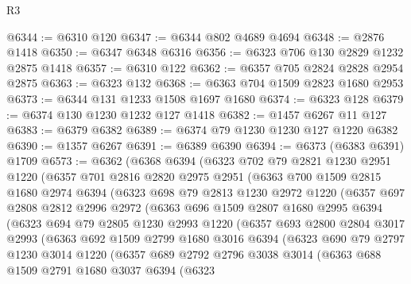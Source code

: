 \begin{lexlean}{R3}
\begin{coremodule}
@6344 := @6310 @120
@6347 := @6344 @802 @4689 @4694
@6348 := @2876 @1418
@6350 := @6347 @6348 @6316
@6356 := @6323 @706 @130 @2829 @1232 @2875 @1418
@6357 := @6310 @122
@6362 := @6357 @705 @2824 @2828 @2954 @2875
@6363 := @6323 @132
@6368 := @6363 @704 @1509 @2823 @1680 @2953
@6373 := @6344 @131 @1233 @1508 @1697 @1680
@6374 := @6323 @128
@6379 := @6374 @130 @1230 @1232 @127 @1418
@6382 := @1457 @6267 @11 @127
@6383 := @6379 @6382
@6389 := @6374 @79 @1230 @1230 @127 @1220 @6382
@6390 := @1357 @6267
@6391 := @6389 @6390
@6394 := @6373 (@6383 @6391) @1709
@6573 := @6362
    (@6368
      @6394
      (@6323
        @702
        @79
        @2821
        @1230
        @2951
        @1220
        (@6357
          @701
          @2816
          @2820
          @2975
          @2951
          (@6363
            @700
            @1509
            @2815
            @1680
            @2974
            @6394
            (@6323
              @698
              @79
              @2813
              @1230
              @2972
              @1220
              (@6357
                @697
                @2808
                @2812
                @2996
                @2972
                (@6363
                  @696
                  @1509
                  @2807
                  @1680
                  @2995
                  @6394
                  (@6323
                    @694
                    @79
                    @2805
                    @1230
                    @2993
                    @1220
                    (@6357
                      @693
                      @2800
                      @2804
                      @3017
                      @2993
                      (@6363
                        @692
                        @1509
                        @2799
                        @1680
                        @3016
                        @6394
                        (@6323
                          @690
                          @79
                          @2797
                          @1230
                          @3014
                          @1220
                          (@6357
                            @689
                            @2792
                            @2796
                            @3038
                            @3014
                            (@6363
                              @688
                              @1509
                              @2791
                              @1680
                              @3037
                              @6394
                              (@6323

\end{coremodule}
\end{lexlean}
